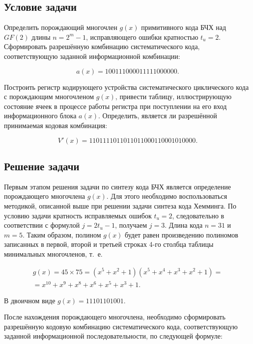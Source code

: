 \subsection{Условие задачи}

Определить порождающий многочлен $g(x)$ примитивного кода БЧХ над
$GF(2)$ длины $n = 2^m -1$, исправляющего ошибки кратностью
$t_u = 2$. Сформировать разрешённую комбинацию систематического
кода, соответствующую заданной информационной комбинации:

\begin{equation*}
a(x) = 100111000011111000000.
\end{equation*}

Построить регистр кодирующего устройства систематического циклического
кода с порождающим многочленом $g(x)$, привести таблицу,
иллюстрирующую состояние ячеек в процессе работы регистра при
поступлении на его вход информационного блока $a(x)$. Определить,
является ли разрешённой принимаемая кодовая комбинация:

\begin{equation*}
V'(x) = 1101111011011011000110001010000.
\end{equation*}


\subsection{Решение задачи}

Первым этапом решения задачи по синтезу кода БЧХ является определение
порождающего многочлена $g(x)$. Для этого необходимо воспользоваться
методикой, описанной выше при решении задачи синтеза кода Хемминга. По
условию задачи кратность исправляемых ошибок $t_u = 2$,
следовательно в соответствии с формулой $j = 2t_u - 1$,
получаем $j = 3$. Длина кода $n = 31$ и $m =5$. Таким образом, полином
$g(x)$ будет равен произведению полиномов записанных в первой, второй
и третьей строках 4-го столбца таблицы минимальных многочленов, т.~е.

\begin{gather*}
  g(x) = 45 \times 75 = (x^5 + x^2 + 1)(x^5 + x^4 + x^3 + x^2 + 1) = \\
  = x^{10} + x^9 + x^8 + x^6 + x^5 + x^3 + 1.
\end{gather*}

В двоичном виде $g(x) = 11101101001$.

После нахождения порождающего многочлена, необходимо сформировать
разрешённую кодовую комбинацию систематического кода, соответствующую
заданной информационной последовательности, по следующей формуле:

